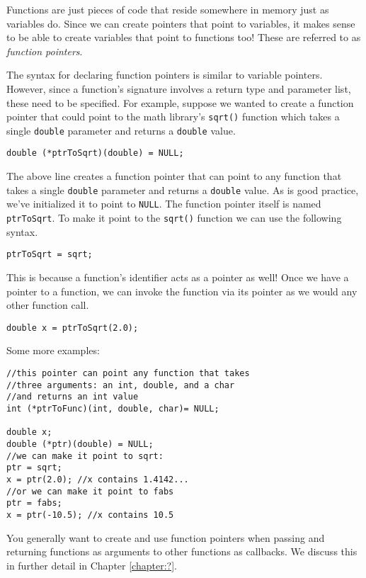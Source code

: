 Functions are just pieces of code that reside somewhere in 
memory just as variables do.  Since we can create pointers
that point to variables, it makes sense to be able to create
variables that point to functions too!  These are referred to
as \emph{function pointers}.  

The syntax for declaring function pointers is similar to variable
pointers.  However, since a function's signature involves a
return type and parameter list, these need to be specified.
For example, suppose we wanted to create a function pointer
that could point to the math library's \texttt{sqrt()} function
which takes a single \texttt{double} parameter and
returns a \texttt{double} value.  

\texttt{double (*ptrToSqrt)(double) = NULL;}

The above line creates a function pointer that can point to
any function that takes a single \texttt{double} parameter
and returns a \texttt{double} value.  As is good practice,
we've initialized it to point to \texttt{NULL}.  The function
pointer itself is named \texttt{ptrToSqrt}.  To make it
point to the \texttt{sqrt()} function we can use the following
syntax.

\texttt{ptrToSqrt = sqrt;}

This is because a function's identifier acts as a pointer as well!
Once we have a pointer to a function, we can invoke the function
via its pointer as we would any other function call.

\texttt{double x = ptrToSqrt(2.0);}

Some more examples:

\begin{verbatim}
//this pointer can point any function that takes
//three arguments: an int, double, and a char
//and returns an int value
int (*ptrToFunc)(int, double, char)= NULL;

double x;
double (*ptr)(double) = NULL;
//we can make it point to sqrt:
ptr = sqrt;
x = ptr(2.0); //x contains 1.4142...
//or we can make it point to fabs
ptr = fabs;
x = ptr(-10.5); //x contains 10.5
\end{verbatim}

You generally want to create and use function pointers when
passing and returning functions as arguments to other
functions as callbacks.  We discuss this in further detail
in Chapter \ref{chapter:?}.










